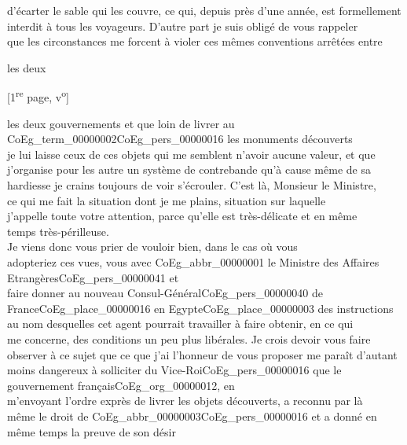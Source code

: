 \documentclass{book}
\begin{document}
d’écarter le sable qui les couvre, ce qui, depuis près d’une année, est formellement\\
interdit à tous les voyageurs. D’autre part je suis obligé de vous rappeler\\
que les circonstances me forcent à violer ces mêmes conventions arrêtées entre\\
\begin{flushright}les deux\end{flushright}
 {\footnotesize \begin{center} {[1\textsuperscript{re} page, v\textsuperscript{o}]}\end{center}}
les deux gouvernements et que loin de livrer au \gls{CoEg_term_00000002}\gls{CoEg_pers_00000016} les monuments découverts\\
je lui laisse ceux de ces objets qui me semblent n’avoir aucune valeur, et que\\
j’organise pour les autre un système de contrebande qu’à cause même de sa\\
hardiesse je crains toujours de voir s’écrouler. C’est là, Monsieur le Ministre,\\
ce qui me fait la situation dont je me plains, situation sur laquelle\\
j’appelle toute votre attention, parce qu’elle est très-délicate et en même\\
temps très-périlleuse.\\
\indent Je viens donc vous prier de vouloir bien, dans le cas où vous\\
adopteriez ces vues, vous avec \gls{CoEg_abbr_00000001} le Ministre des Affaires Etrangères\gls{CoEg_pers_00000041} et\\
faire donner au nouveau Consul-Général\gls{CoEg_pers_00000040} de France\gls{CoEg_place_00000016} en Egypte\gls{CoEg_place_00000003} des instructions\\
au nom desquelles cet agent pourrait travailler à faire obtenir, en ce qui\\
me concerne, des conditions un peu plus libérales. Je crois devoir vous faire\\
observer à ce sujet que ce que j’ai l’honneur de vous proposer me paraît d’autant\\
moins dangereux à solliciter du Vice-Roi\gls{CoEg_pers_00000016} que le gouvernement français\gls{CoEg_org_00000012}, en\\
m’envoyant l’ordre exprès de livrer les objets découverts, a reconnu par là\\
même le droit de \gls{CoEg_abbr_00000003}\gls{CoEg_pers_00000016} et a donné en même temps la preuve de son désir\\
\end{document}
